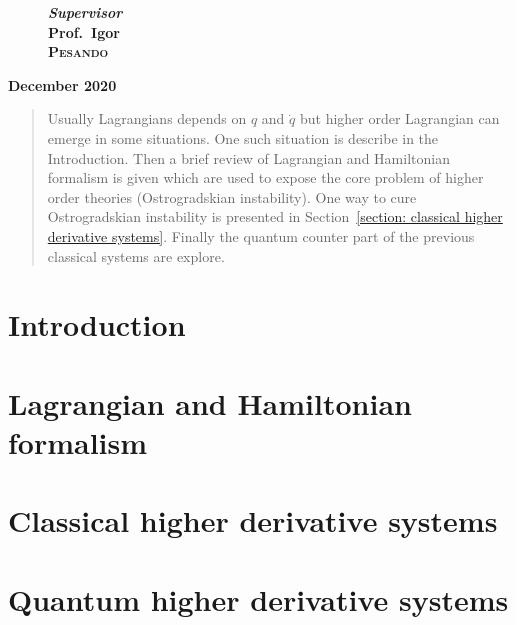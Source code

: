 \documentclass[a4paper]{article}
\theoremstyle{definition}
\numberwithin{equation}{section}
\begin{document}
\begin{titlepage}
\begin{figure}[h]
\begin{minipage}{0.4\textwidth}
  \begin{flushright}
  \Large
  \textbf{\textit{Supervisor}\\
    Prof.\ Igor\\ \textsc{Pesando}} %
  \end{flushright}

  \end{minipage}
  \end{figure}

  \vfill
  \textbf{{\Large December 2020}}

  \end{titlepage}

  \tableofcontents

  \newpage

  \begin{abstract}
    Usually Lagrangians depends on $q$ and $\dot{q}$ but higher order Lagrangian
    can emerge in some situations. One such situation is describe in the
    Introduction. Then a brief review of Lagrangian and Hamiltonian formalism
    is given which are used to expose the core problem of higher order
    theories (Ostrogradskian instability). One way to cure Ostrogradskian
    instability is presented in Section~\ref{section: classical higher
    derivative systems}. Finally the quantum counter part of the
    previous classical systems are explore.
  \end{abstract}\vspace{5em}


  \section{Introduction}\label{section: introduction}
  

  \section{Lagrangian and Hamiltonian formalism}\label{section: lagrangin and
  hamiltonian formalism}
  

  \section{Classical higher derivative systems}\label{section: classical higher
  derivative systems}
  

  \section{Quantum higher derivative systems}\label{section: quantum higher
  derivative systems}
  
\end{document}
